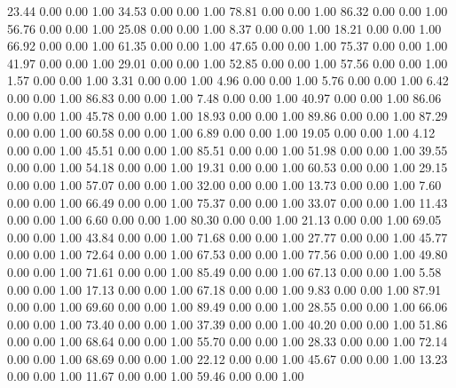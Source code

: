    23.44   0.00   0.00   1.00
   34.53   0.00   0.00   1.00
   78.81   0.00   0.00   1.00
   86.32   0.00   0.00   1.00
   56.76   0.00   0.00   1.00
   25.08   0.00   0.00   1.00
    8.37   0.00   0.00   1.00
   18.21   0.00   0.00   1.00
   66.92   0.00   0.00   1.00
   61.35   0.00   0.00   1.00
   47.65   0.00   0.00   1.00
   75.37   0.00   0.00   1.00
   41.97   0.00   0.00   1.00
   29.01   0.00   0.00   1.00
   52.85   0.00   0.00   1.00
   57.56   0.00   0.00   1.00
    1.57   0.00   0.00   1.00
    3.31   0.00   0.00   1.00
    4.96   0.00   0.00   1.00
    5.76   0.00   0.00   1.00
    6.42   0.00   0.00   1.00
   86.83   0.00   0.00   1.00
    7.48   0.00   0.00   1.00
   40.97   0.00   0.00   1.00
   86.06   0.00   0.00   1.00
   45.78   0.00   0.00   1.00
   18.93   0.00   0.00   1.00
   89.86   0.00   0.00   1.00
   87.29   0.00   0.00   1.00
   60.58   0.00   0.00   1.00
    6.89   0.00   0.00   1.00
   19.05   0.00   0.00   1.00
    4.12   0.00   0.00   1.00
   45.51   0.00   0.00   1.00
   85.51   0.00   0.00   1.00
   51.98   0.00   0.00   1.00
   39.55   0.00   0.00   1.00
   54.18   0.00   0.00   1.00
   19.31   0.00   0.00   1.00
   60.53   0.00   0.00   1.00
   29.15   0.00   0.00   1.00
   57.07   0.00   0.00   1.00
   32.00   0.00   0.00   1.00
   13.73   0.00   0.00   1.00
    7.60   0.00   0.00   1.00
   66.49   0.00   0.00   1.00
   75.37   0.00   0.00   1.00
   33.07   0.00   0.00   1.00
   11.43   0.00   0.00   1.00
    6.60   0.00   0.00   1.00
   80.30   0.00   0.00   1.00
   21.13   0.00   0.00   1.00
   69.05   0.00   0.00   1.00
   43.84   0.00   0.00   1.00
   71.68   0.00   0.00   1.00
   27.77   0.00   0.00   1.00
   45.77   0.00   0.00   1.00
   72.64   0.00   0.00   1.00
   67.53   0.00   0.00   1.00
   77.56   0.00   0.00   1.00
   49.80   0.00   0.00   1.00
   71.61   0.00   0.00   1.00
   85.49   0.00   0.00   1.00
   67.13   0.00   0.00   1.00
    5.58   0.00   0.00   1.00
   17.13   0.00   0.00   1.00
   67.18   0.00   0.00   1.00
    9.83   0.00   0.00   1.00
   87.91   0.00   0.00   1.00
   69.60   0.00   0.00   1.00
   89.49   0.00   0.00   1.00
   28.55   0.00   0.00   1.00
   66.06   0.00   0.00   1.00
   73.40   0.00   0.00   1.00
   37.39   0.00   0.00   1.00
   40.20   0.00   0.00   1.00
   51.86   0.00   0.00   1.00
   68.64   0.00   0.00   1.00
   55.70   0.00   0.00   1.00
   28.33   0.00   0.00   1.00
   72.14   0.00   0.00   1.00
   68.69   0.00   0.00   1.00
   22.12   0.00   0.00   1.00
   45.67   0.00   0.00   1.00
   13.23   0.00   0.00   1.00
   11.67   0.00   0.00   1.00
   59.46   0.00   0.00   1.00
